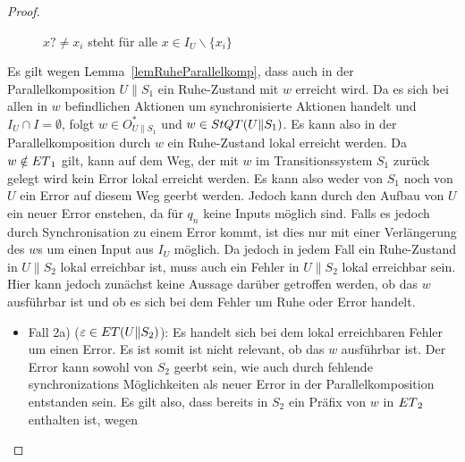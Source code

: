 \begin{proof}
\begin{itemize}
\begin{figure} [h!tbp]
\begin{center}
        \caption{$x?\neq x_i$ steht für alle $x\in I_U\backslash\{x_i\}$}
\label{UohneEmitI}
      \end{center}
      \end{figure}
      Es gilt wegen Lemma~\ref{lemRuheParallelkomp}, dass auch in der
      Parallelkomposition $U\|S_1$ ein Ruhe-Zustand mit $w$ erreicht wird. Da
      es sich bei allen in $w$ befindlichen Aktionen um synchronisierte
      Aktionen handelt und $I_U\cap I=\emptyset$, folgt $w\in O_{U\|S_1}^*$ und
      $w\in StQT{}(U\|S_1)$. Es kann also in der Parallelkomposition durch $w$
      ein Ruhe-Zustand lokal erreicht werden. Da $w\notin ET{}_1$ gilt, kann
      auf dem Weg, der mit $w$ im Transitionssystem $S_1$ zurück gelegt wird
      kein Error lokal erreicht werden. Es kann also weder von $S_1$ noch von
      $U$ ein Error auf diesem Weg geerbt werden. Jedoch kann durch den Aufbau
      von $U$ ein neuer Error enstehen, da für $q_n$ keine Inputs möglich sind.
      Falls es jedoch durch Synchronisation zu einem Error kommt, ist dies nur
      mit einer Verlängerung des $w$s um einen Input aus $I_U$ möglich. Da
      jedoch in jedem Fall ein Ruhe-Zustand in $U\|S_2$ lokal erreichbar ist,
      muss auch ein Fehler in $U\|S_2$ lokal erreichbar sein. Hier kann jedoch
      zunächst keine Aussage darüber getroffen werden, ob das $w$ ausführbar
      ist und ob es sich bei dem Fehler um Ruhe oder Error handelt.
      \begin{itemize}
        \item Fall 2a) ($\varepsilon\in ET{}(U\|S_2)$): Es handelt sich bei
          dem lokal erreichbaren Fehler um einen Error. Es ist somit ist nicht
          relevant, ob
          das $w$ ausführbar ist. Der Error kann sowohl von $S_2$ geerbt sein,
          wie auch durch fehlende synchronizations Möglichkeiten als neuer
          Error in der Parallelkomposition entstanden sein. Es gilt also, dass
          bereits in $S_2$ ein Präfix von $w$ in $ET{}_2$ enthalten ist, wegen

\end{itemize}
\end{itemize}
\end{proof}
